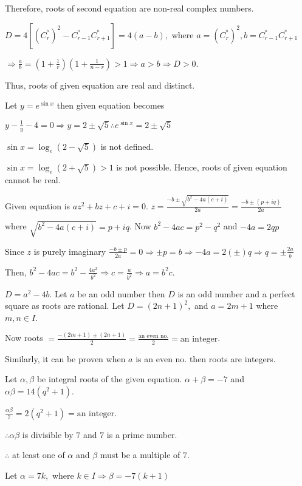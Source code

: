   Therefore, roots of second equation are non-real complex numbers.
\item $D = 4[(C_r^^n)^2 - C_{r - 1}^^nC_{r + 1}^^n] = 4(a - b),$ where $a = (C_r^^n)^2, b = C_{r - 1}^^nC_{r
  + 1}^^n$

  $\Rightarrow \frac{a}{b} = \left(1 + \frac{1}{r}\right)\left(1 + \frac{1}{n - r}\right) > 1\Rightarrow a >
  b \Rightarrow D > 0$.

  Thus, roots of given equation are real and distinct.
\item Let $y = e^{\sin x}$ then given equation becomes

  $y - \frac{1}{y} - 4 = 0\Rightarrow y = 2\pm \sqrt{5} \therefore e^{\sin x} = 2 \pm \sqrt{5}$

  $\sin x = \log_e (2 - \sqrt{5})$ is not defined.

  $\sin x = \log_e (2 + \sqrt{5}) > 1$ is not possible. Hence, roots of given equation cannot be real.
\item Given equation is $az^2 + bz + c + i = 0$. $z = \frac{-b \pm \sqrt{b^2 - 4a(c + i)}}{2a} = \frac{-b
  \pm(p + iq)}{2a}$

  where $\sqrt{b^2 - 4a(c + i)} = p + iq$. Now $b^2 - 4ac = p^2 - q^2$ and $-4a = 2qp$

  Since $z$ is purely imaginary $\frac{-b \pm p}{2a} = 0 \Rightarrow \pm p = b\Rightarrow -4a = 2(\pm)q
  \Rightarrow q = \pm \frac{2a}{b}$

  Then, $b^2 - 4ac = b^2 - \frac{4a^2}{b^2}\Rightarrow c = \frac{a}{b^2} \Rightarrow a = b^2c$.
\item $D = a^2 - 4b$. Let $a$ be an odd number then $D$ is an odd number and a perfect square as roots
  are rational. Let $D = (2n + 1)^2,$ and $a = 2m + 1$ where $m, n \in I$.

  Now roots $= \frac{-(2m + 1)\pm (2n + 1)}{2} = \frac{\text{an even no.}}{2} = \text{an integer}$.

  Similarly, it can be proven when $a$ is an even no. then roots are integers.
\item Let $\alpha, \beta$ be integral roots of the given equation. $\alpha + \beta = -7$ and $\alpha\beta =
  14(q^2 + 1)$.

  $\frac{\alpha\beta}{7} = 2(q^2 + 1) = \text{an integer}$.

  $\therefore \alpha\beta$ is divisible by $7$ and $7$ is a prime number.

  $\therefore$ at least one of $\alpha$ and $\beta$ must be a multiple of $7$.

  Let $\alpha = 7k,$ where $k \in I\Rightarrow \beta = -7(k + 1)$


